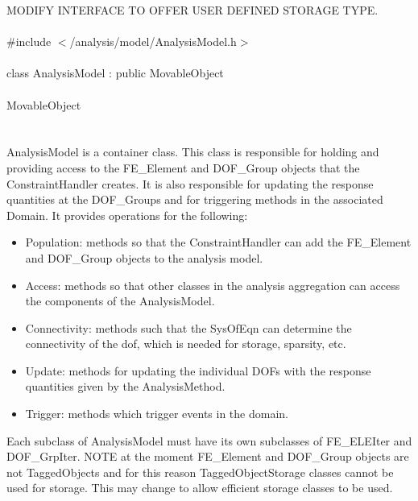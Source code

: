 
MODIFY INTERFACE TO OFFER USER DEFINED STORAGE TYPE. \\

   \\
\indent \#include $<$/analysis/model/AnalysisModel.h$>$  \\

  \\
\indent class AnalysisModel : public MovableObject  \\

 \\
\indent MovableObject \\
\indent{} \\

  \\
\indent AnalysisModel is a container class. This class is responsible
for holding and providing access to the FE\_Element and DOF\_Group
objects that the ConstraintHandler creates. It is also responsible
for updating the response quantities at the DOF\_Groups and for
triggering methods in the associated Domain. It provides operations
for the following: \begin{itemize} 
\item Population: methods so that the ConstraintHandler can add the
FE\_Element and DOF\_Group objects to the analysis model. 
\item Access: methods so that other classes in the analysis aggregation
can access the components of the AnalysisModel. 
\item Connectivity: methods such that the SysOfEqn can determine the
connectivity of the dof, which is needed for storage, sparsity, etc.
\item Update: methods for updating the individual DOFs with the
response quantities given by the AnalysisMethod.
\item Trigger: methods which trigger events in the domain.
\end{itemize} 
Each subclass of AnalysisModel must have its own subclasses
of FE\_ELEIter and DOF\_GrpIter. NOTE at the moment FE\_Element and
DOF\_Group objects are not TaggedObjects and for this reason
TaggedObjectStorage classes cannot be used for storage. This may
change to allow efficient storage classes to be used.\\


